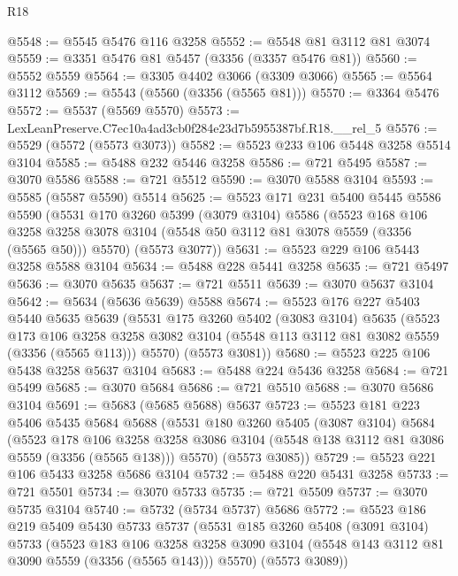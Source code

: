 \begin{lexlean}{R18}
\begin{coremodule}
@5548 := @5545 @5476 @116 @3258
@5552 := @5548 @81 @3112 @81 @3074
@5559 := @3351 @5476 @81 @5457 (@3356 (@3357 @5476 @81))
@5560 := @5552 @5559
@5564 := @3305 @4402 @3066 (@3309 @3066)
@5565 := @5564 @3112
@5569 := @5543 (@5560 (@3356 (@5565 @81)))
@5570 := @3364 @5476
@5572 := @5537 (@5569 @5570)
@5573 := LexLeanPreserve.C7ec10a4ad3cb0f284e23d7b5955387bf.R18.__rel_5
@5576 := @5529 (@5572 (@5573 @3073))
@5582 := @5523 @233 @106 @5448 @3258 @5514 @3104
@5585 := @5488 @232 @5446 @3258
@5586 := @721 @5495
@5587 := @3070 @5586
@5588 := @721 @5512
@5590 := @3070 @5588 @3104
@5593 := @5585 (@5587 @5590) @5514
@5625 := @5523
    @171
    @231
    @5400
    @5445
    @5586
    @5590
    (@5531
      @170
      @3260
      @5399
      (@3079 @3104)
      @5586
      (@5523
        @168
        @106
        @3258
        @3258
        @3078
        @3104
        (@5548 @50 @3112 @81 @3078 @5559 (@3356 (@5565 @50)))
        @5570)
      (@5573 @3077))
@5631 := @5523 @229 @106 @5443 @3258 @5588 @3104
@5634 := @5488 @228 @5441 @3258
@5635 := @721 @5497
@5636 := @3070 @5635
@5637 := @721 @5511
@5639 := @3070 @5637 @3104
@5642 := @5634 (@5636 @5639) @5588
@5674 := @5523
    @176
    @227
    @5403
    @5440
    @5635
    @5639
    (@5531
      @175
      @3260
      @5402
      (@3083 @3104)
      @5635
      (@5523
        @173
        @106
        @3258
        @3258
        @3082
        @3104
        (@5548 @113 @3112 @81 @3082 @5559 (@3356 (@5565 @113)))
        @5570)
      (@5573 @3081))
@5680 := @5523 @225 @106 @5438 @3258 @5637 @3104
@5683 := @5488 @224 @5436 @3258
@5684 := @721 @5499
@5685 := @3070 @5684
@5686 := @721 @5510
@5688 := @3070 @5686 @3104
@5691 := @5683 (@5685 @5688) @5637
@5723 := @5523
    @181
    @223
    @5406
    @5435
    @5684
    @5688
    (@5531
      @180
      @3260
      @5405
      (@3087 @3104)
      @5684
      (@5523
        @178
        @106
        @3258
        @3258
        @3086
        @3104
        (@5548 @138 @3112 @81 @3086 @5559 (@3356 (@5565 @138)))
        @5570)
      (@5573 @3085))
@5729 := @5523 @221 @106 @5433 @3258 @5686 @3104
@5732 := @5488 @220 @5431 @3258
@5733 := @721 @5501
@5734 := @3070 @5733
@5735 := @721 @5509
@5737 := @3070 @5735 @3104
@5740 := @5732 (@5734 @5737) @5686
@5772 := @5523
    @186
    @219
    @5409
    @5430
    @5733
    @5737
    (@5531
      @185
      @3260
      @5408
      (@3091 @3104)
      @5733
      (@5523
        @183
        @106
        @3258
        @3258
        @3090
        @3104
        (@5548 @143 @3112 @81 @3090 @5559 (@3356 (@5565 @143)))
        @5570)
      (@5573 @3089))

\end{coremodule}
\end{lexlean}
